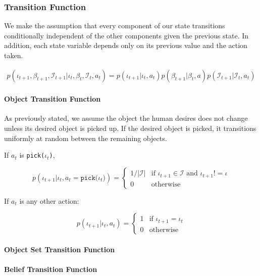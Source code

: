 \documentclass{article}
\newcommand{\Iota}{\mathcal{I}}
\begin{document}
\subsubsection{Transition Function} \label{sssec:tf}

We make the assumption that every component of our state transitions conditionally independent of the other components given the previous state. In addition, each state variable depends only on its previous value and the action taken. 

\begin{align*}
	p(\iota_{t+1}, \beta_{t+1}, \Iota_{t+1} | \iota_t, \beta_t, \Iota_t, a_t)  =  p(\iota_{t+1} | \iota_t, a_t) p(\beta_{t+1} | \beta_t, a) p(\Iota_{t+1} | \Iota_t, a_t)
\end{align*}

\paragraph{Object Transition Function}
As previously stated, we assume the object the human desires does not change unless its desired object is picked up. If the desired object is picked, it transitions uniformly at random between the remaining objects. 

If $a_t$ is \texttt{pick($\iota_t$)}, 

\begin{equation}
	p(\iota_{t+1} | \iota_t, a_t = \texttt{pick($\iota_t$)}) = \begin{cases}
		1/|\Iota| & \text{if } \iota_{t+1} \in \Iota \text{ and } \iota_{t+1} != \iota \\
		0 & \text{otherwise} 
	\end{cases}
\end{equation}


If $a_t$ is any other action: 

\begin{equation}
	p(\iota_{t+1} | \iota_t, a_t) = \begin{cases} 
		1 & \text{if $\iota_{t+1} = \iota_t$} \\
		0 & \text{otherwise}
	\end{cases}
\end{equation}

\paragraph{Object Set Transition Function}

\paragraph{Belief Transition Function}
\end{document}
